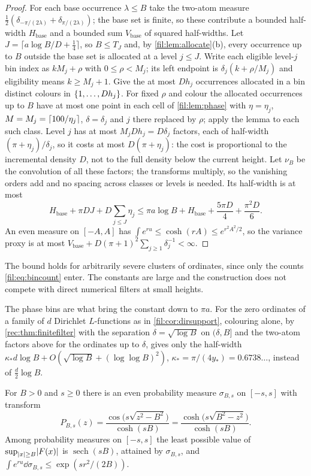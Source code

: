\begin{proof}
For each base occurrence $\lambda\le B$ take the two-atom measure $\tfrac12(\delta_{-\pi/(2\lambda)}+\delta_{\pi/(2\lambda)})$;
the base set is finite, so these contribute a bounded half-width $H_{\mathrm{base}}$ and a bounded sum
$V_{\mathrm{base}}$ of squared half-widths. Let $J=\lceil a\log B/D+\tfrac14\rceil$, so $B\le T_J$ and, by
\cref{fil:lem:allocate}(b), every occurrence up to $B$ outside the base set is allocated at a level $j\le J$.
Write each eligible level-$j$ bin index as $kM_j+\rho$ with $0\le\rho<M_j$; its left endpoint is
$\delta_j(k+\rho/M_j)$ and eligibility means $k\ge M_j+1$. Give the at most $Dh_j$ occurrences allocated in
a bin distinct colours in $\{1,\dots,Dh_j\}$. For fixed $\rho$ and colour the allocated occurrences up to $B$
have at most one point in each cell of \cref{fil:lem:phase} with $\eta=\eta_j$, $M=M_j=\lceil100/\eta_j\rceil$,
$\delta=\delta_j$ and $j$ there replaced by $\rho$; apply the lemma to each such class. Level $j$ has at most
$M_jDh_j=D\delta_j$ factors, each of half-width $(\pi+\eta_j)/\delta_j$, so it costs at most $D(\pi+\eta_j)$:
the cost is proportional to the incremental density $D$, not to the full density below the current height.
Let $\nu_B$ be the convolution of all these factors; the transforms multiply, so the vanishing orders add and
no spacing across classes or levels is needed. Its half-width is at most
\[
 H_{\mathrm{base}}+\pi DJ+D\sum_{j\le J}\eta_j\le\pi a\log B+H_{\mathrm{base}}+\frac{5\pi D}4+\frac{\pi^2D}6 .
\]
An even measure on $[-A,A]$ has $\int e^{ru}\le\cosh(rA)\le e^{r^2A^2/2}$, so the variance proxy is at most
$V_{\mathrm{base}}+D(\pi+1)^2\sum_{j\ge1}\delta_j^{-1}<\infty$.
\end{proof}

The bound holds for arbitrarily severe clusters of ordinates, since only the counts
\eqref{fil:eq:bincount} enter. The constants are large and the construction does not compete with direct
numerical filters at small heights.

The phase bins are what bring the constant down to $\pi a$. For the zero ordinates of a family of $d$
Dirichlet $L$-functions as in \cref{fil:cor:dirsupport}, colouring alone, by \cref{rec:thm:finitefilter} with the
separation $\delta=\sqrt{\log B}$ on $(\delta,B]$ and the two-atom factors above for the ordinates up to $\delta$, gives
only the half-width $\kappa_*d\log B+O(\sqrt{\log B}+(\log\log B)^2)$, $\kappa_*=\pi/(4y_*)=0.6738\ldots$, instead of
$\tfrac d2\log B$.

\begin{proposition}\label{fil:prop:cheb}
For $B>0$ and $s\ge0$ there is an even probability measure $\sigma_{B,s}$ on $[-s,s]$ with transform
\[
 P_{B,s}(z)=\frac{\cos\bigl(s\sqrt{z^2-B^2}\bigr)}{\cosh(sB)}=\frac{\cosh\bigl(s\sqrt{B^2-z^2}\bigr)}{\cosh(sB)} .
\]
Among probability measures on $[-s,s]$ the least possible value of $\sup_{\lvert x\rvert\ge B}\lvert F(x)\rvert$ is
$\operatorname{sech}(sB)$, attained by $\sigma_{B,s}$, and $\int e^{ru}\dd\sigma_{B,s}\le\exp(sr^2/(2B))$.
\end{proposition}


